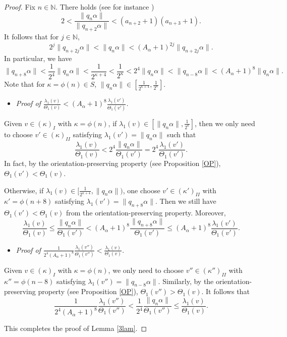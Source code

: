 \documentclass{amsart}
\newcounter{item}[section]
\theoremstyle{definition}
\begin{document}
\begin{proof}
Fix $n\in \mathbb{N}$. There holds (see for instance \cite[V. (7.6)]{H11})
\[2<\frac{\|q_n\alpha\|}{\|q_{n+2}\alpha\|}<(a_{n+2}+1)(a_{n+3}+1).\]
It follows that for $j\in \mathbb{N}$,
\[2^j\|q_{n+2j}\alpha\|<\|q_n\alpha\|<(A_\alpha+1)^{2j}\|q_{n+2j}\alpha\|.\]
In particular, we have
\[\|q_{n+8}\alpha\|<\frac{1}{2^4}\|q_n\alpha\|<\frac{1}{2^{\kappa+4}}<\frac{1}{2^\kappa}<2^4\|q_n\alpha\|<\|q_{n-8}\alpha\|<(A_\alpha+1)^{8}\|q_n\alpha\|.\]
Note that for  $\kappa=\phi(n)\in S$, $\|q_n\alpha\|\in [\frac{1}{2^{\kappa+4}},\frac{1}{2^\kappa}]$.
\begin{itemize}
	\item {\it Proof of $\frac{\lambda_1(v)}{\Theta_1(v)}< (A_\alpha + 1)^8 \frac{\lambda_1(v')}{\Theta_1(v')}$.}
\end{itemize}
Given $v\in (\kappa)_{I}$ with $\kappa=\phi(n)$, if $\lambda_1(v)\in [\|q_n\alpha\|, \frac{1}{2^\kappa}]$, then we only need to choose $v'\in (\kappa)_{II}$ satisfying $\lambda_1(v')=\|q_n\alpha\|$ such that
\[\frac{\lambda_1(v)}{\Theta_1(v)}< 2^4\frac{\|q_n\alpha\|}{\Theta_1(v')}= 2^4\frac{\lambda_1(v')}{\Theta_1(v')}.\]
In fact, by the orientation-preserving property (see Proposition \ref{OP}), $\Theta_1(v')<\Theta_1(v)$.

Otherwise, if  $\lambda_1(v)\in [\frac{1}{2^{\kappa+4}}, \|q_n\alpha\|)$, one choose  $v'\in (\kappa')_{II}$ with $\kappa'=\phi(n+8)$ satisfying $\lambda_1(v')=\|q_{n+8}\alpha\|$. Then we still have $\Theta_1(v')<\Theta_1(v)$ from the orientation-preserving property. Moreover,
\[\frac{\lambda_1(v)}{\Theta_1(v)}\leq \frac{\|q_n\alpha\|}{\Theta_1(v')}<(A_\alpha+1)^8\frac{\|q_{n+8}\alpha\|}{\Theta_1(v')}\leq(A_\alpha+1)^8\frac{\lambda_1(v')}{\Theta_1(v')}.\]
\begin{itemize}
	\item {\it Proof of $\frac{1}{2^4 (A_\alpha + 1)^8} \frac{\lambda_1(v'')}{\Theta_1(v'')}< \frac{\lambda_1(v)}{\Theta_1(v)}$.}
\end{itemize}		
Given $v\in (\kappa)_{I}$ with $\kappa=\phi(n)$,  we only need to choose $v''\in (\kappa'')_{II}$ with  $\kappa''=\phi(n-8)$ satisfying $\lambda_1(v'')=\|q_{n-8}\alpha\|$. Similarly, by the orientation-preserving property (see Proposition \ref{OP}), $\Theta_1(v'')>\Theta_1(v)$. It follows that
\[\frac{1}{2^4(A_\alpha+1)^{8}}\frac{\lambda_1(v'')}{\Theta_1(v'')}<\frac{1}{2^4}\frac{\|q_n\alpha\|}{\Theta_1(v'')}\leq \frac{\lambda_1(v)}{\Theta_1(v)}.\]

This completes the proof of Lemma \ref{3lam}.
\end{proof}
\end{document}

